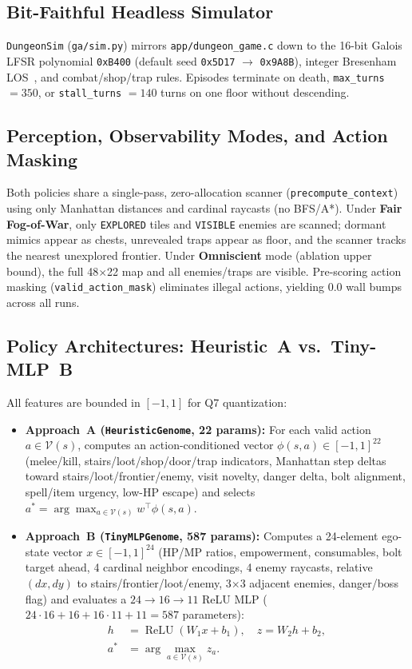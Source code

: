 \documentclass[conference]{IEEEtran}
\begin{document}
\subsection{Bit-Faithful Headless Simulator}
\texttt{DungeonSim} (\texttt{ga/sim.py}) mirrors \texttt{app/dungeon\_game.c} down to the 16-bit Galois LFSR polynomial \texttt{0xB400} (default seed \texttt{0x5D17} $\rightarrow$ \texttt{0x9A8B}), integer Bresenham LOS~\cite{bresenham}, and combat/shop/trap rules. Episodes terminate on death, \texttt{max\_turns} $= 350$, or \texttt{stall\_turns} $= 140$ turns on one floor without descending.

\subsection{Perception, Observability Modes, and Action Masking}
Both policies share a single-pass, zero-allocation scanner (\texttt{precompute\_context}) using only Manhattan distances and cardinal raycasts (no BFS/A*). Under \textbf{Fair Fog-of-War}, only \texttt{EXPLORED} tiles and \texttt{VISIBLE} enemies are scanned; dormant mimics appear as chests, unrevealed traps appear as floor, and the scanner tracks the nearest unexplored frontier. Under \textbf{Omniscient} mode (ablation upper bound), the full 48$\times$22 map and all enemies/traps are visible. Pre-scoring action masking (\texttt{valid\_action\_mask}) eliminates illegal actions, yielding 0.0 wall bumps across all runs.

\subsection{Policy Architectures: Heuristic~A vs.\ Tiny-MLP~B}
All features are bounded in $[-1, 1]$ for Q7 quantization:
\begin{itemize}
    \item \textbf{Approach~A (\texttt{HeuristicGenome}, 22 params):} For each valid action $a \in \mathcal{V}(s)$, computes an action-conditioned vector $\phi(s, a) \in [-1, 1]^{22}$ (melee/kill, stairs/loot/shop/door/trap indicators, Manhattan step deltas toward stairs/loot/frontier/enemy, visit novelty, danger delta, bolt alignment, spell/item urgency, low-HP escape) and selects $a^* = \arg\max_{a \in \mathcal{V}(s)} w^\top \phi(s, a)$.
    \item \textbf{Approach~B (\texttt{TinyMLPGenome}, 587 params):} Computes a 24-element ego-state vector $x \in [-1, 1]^{24}$ (HP/MP ratios, empowerment, consumables, bolt target ahead, 4 cardinal neighbor encodings, 4 enemy raycasts, relative $(dx, dy)$ to stairs/frontier/loot/enemy, 3$\times$3 adjacent enemies, danger/boss flag) and evaluates a $24 \to 16 \to 11$ ReLU MLP ($24\cdot 16 + 16 + 16\cdot 11 + 11 = 587$ parameters):
    \begin{equation}
    \begin{aligned}
        h &= \operatorname{ReLU}(W_1 x + b_1), \quad z = W_2 h + b_2, \\
        a^* &= \arg\max_{a \in \mathcal{V}(s)} z_a.
    \end{aligned}
    \end{equation}
\end{itemize}
\end{document}
